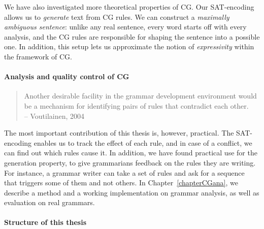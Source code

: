 We have also investigated more theoretical properties of CG.
Our SAT-encoding allows us to \emph{generate} text from CG rules.
We can construct a \emph{maximally ambiguous sentence}: unlike any real sentence, 
every word starts off with every analysis, and the CG rules are responsible for shaping the sentence into a possible one. 
In addition, this setup lets us approximate the notion of \emph{expressivity} within the framework of CG.



\paragraph{Analysis and quality control of CG}

\begin{quote}
Another desirable facility in the grammar development environment would be a mechanism for identifying pairs of rules that contradict each other. \\
-- Voutilainen, 2004
\end{quote}

The most important contribution of this thesis is, however, practical. 
The SAT-encoding enables us to track the effect of each rule, and in case 
of a conflict, we can find out which rules cause it.
In addition, we have found practical use for the generation property, 
to give grammarians feedback on the rules they are writing.
For instance, a grammar writer can take a set of rules and ask for a sequence that triggers some of them and not others.
In Chapter~\ref{chapterCGana}, we describe a method and a working 
implementation on grammar analysis, as well as evaluation on real grammars. 







\paragraph{Structure of this thesis}

